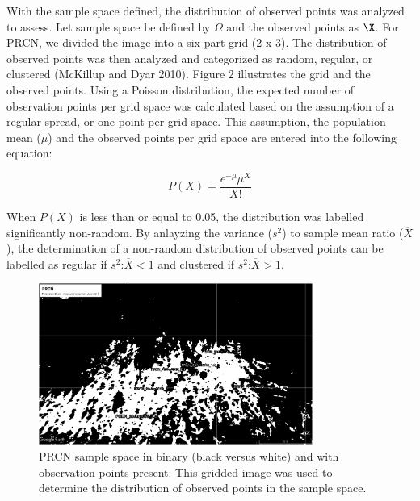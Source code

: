 \vspace{3mm} \par \noindent
With the sample space defined, the distribution of observed points was analyzed to assess. Let sample space be defined by $\Omega$ and the observed points as $\X$.  For PRCN, we divided the image into a six part grid (2 x 3). The distribution of observed points was then analyzed and categorized as random, regular, or clustered (McKillup and Dyar 2010).  Figure 2 illustrates the grid and the observed points.  Using a Poisson distribution, the expected number of observation points per grid space was calculated based on the assumption of a regular spread, or one point per grid space.  This assumption, the population mean ($\mu$) and the observed points per grid space are entered into the following equation:

\begin{equation}
    \label{eq1}
    P(X) = \frac{e^{-\mu} \mu^{X}}{X!}
\end{equation}

\noindent
When $P(X)$ is less than or equal to 0.05, the distribution was labelled significantly non-random.  By anlayzing the variance ($s^{2}$) to sample mean ratio ($\overline{X}$), the determination of a non-random distribution of observed points can be labelled as regular if $s^{2}$:$\overline{X} < 1$ and clustered if $s^{2}$:$\overline{X} > 1$.  

\begin{figure}
    \centering
    \includegraphics[scale=0.8,width=0.8\textwidth]{Figures/PRCN_3x3_BW.png}
    \caption{PRCN sample space in binary (black versus white) and with observation points present.  This gridded image was used to determine the distribution of observed points in the sample space.}
    \label{fig:my_label}
\end{figure}

